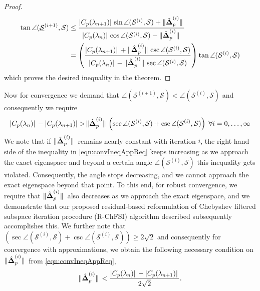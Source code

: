 \documentclass[preprint,3p,number,sort&compress]{elsarticle}
\newcommand{\bDelta}{\boldsymbol{\Delta}}
\DeclarePairedDelimiter\norm{\lVert}{\rVert\,}%
\DeclarePairedDelimiter\abs{\lvert}{\rvert\,}%
\begin{document}
\begin{proof}
 \begin{align*}
  \tan{\angle(\underline{\mathcal{S}}^{(i+1)},\mathcal{S})}&\leq\frac{\abs{C_p(\lambda_{n+1})}\sin{\angle(\mathcal{S}^{(i)},\mathcal{S})}+\norm{\hat{\bDelta}_p^{(i)}}}{\abs{C_p(\lambda_n)}\cos{\angle(\mathcal{S}^{(i)},\mathcal{S})}-\norm{\hat{\bDelta}_p^{(i)}}}\\
  &=\left(\frac{\abs{C_p(\lambda_{n+1})}+\norm{\hat{\bDelta}_p^{(i)}}\csc{\angle(\mathcal{S}^{(i)},\mathcal{S})}}{\abs{C_p(\lambda_n)}-\norm{\hat{\bDelta}_p^{(i)}}\sec{\angle(\mathcal{S}^{(i)},\mathcal{S})}}\right)\tan{\angle(\mathcal{S}^{(i)},\mathcal{S})}
 \end{align*}
which proves the desired inequality in the theorem.
\end{proof}
Now for convergence we demand that $\angle(\underline{\mathcal{S}}^{(i+1)},\mathcal{S})<\angle(\mathcal{S}^{(i)},\mathcal{S})$ and consequently we require
\begin{equation}
 \abs{C_p(\lambda_n)}-\abs{C_p(\lambda_{n+1})}\!>\!\norm{\hat{\bDelta}_p^{(i)}}\left(\sec{\angle(\mathcal{S}^{(i)},\mathcal{S})}+\csc{\angle(\mathcal{S}^{(i)},\mathcal{S})}\right) \; \forall i=0,\dots,\infty\label{eqn:convIneqAppReq}
\end{equation}
We note that if $\norm{\hat{\bDelta}_p^{(i)}}$ remains nearly constant with iteration $i$, the right-hand side of the inequality in \cref{eqn:convIneqAppReq} keeps increasing as we approach the exact eigenspace and beyond a certain angle $\angle(\mathcal{S}^{(i)},\mathcal{S})$ this inequality gets violated. Consequently, the angle stops decreasing, and we cannot approach the exact eigenspace beyond that point. To this end, for robust convergence, we require that $\norm{\hat{\bDelta}_p^{(i)}}$ also decreases as we approach the exact eigenspace, and we demonstrate that our proposed residual-based reformulation of Chebyshev filtered subspace iteration procedure (R-ChFSI) algorithm described subsequently accomplishes this. We further note that $\left(\sec{\angle(\mathcal{S}^{(i)},\mathcal{S})}+\csc{\angle(\mathcal{S}^{(i)},\mathcal{S})}\right)\geq 2\sqrt{2}$ and consequently for convergence with approximations, we obtain the following necessary condition on $\norm{\hat{\bDelta}_p^{(i)}}$ from \cref{eqn:convIneqAppReq}, \begin{align}
 \norm{\hat{\bDelta}_p^{(i)}}<\frac{\abs{C_p(\lambda_n)}-\abs{C_p(\lambda_{n+1})}}{2\sqrt{2}}.
\end{align}
\end{document}
